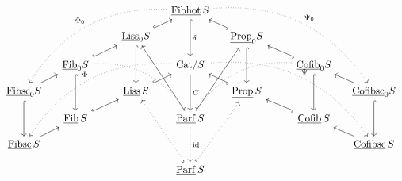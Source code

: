 \[
\begin{tikzcd}[column sep=small, row sep=small]
 & & & & \ul{Fibhot}\,S \arrow[dd,hook,"\delta"] \arrow[dddllll,dotted,bend right,"\Phi_0"'] \arrow[dddrrrr,dotted,bend left,"\Psi_0"] & & & & \\
 & & & \ul{Liss}_0S \arrow[ur,hook] \arrow[dd,hook] & & \ul{Prop}_0S \arrow[ul,hook] \arrow[dd,hook] & & & \\
 & \ul{Fib}_0S \arrow[urr,hook] \arrow[dd,hook] \arrow[ddrrr,dotted,bend left] & & & \Cat/S \arrow[dd,"C"] \arrow[dddllll,dotted,bend right,"\Phi"'] \arrow[dddrrrr,dotted,bend left,"\Psi"] & & & \ul{Cofib}_0S \arrow[ull,hook] \arrow[dd,hook] \arrow[ddlll,dotted,bend right] & \\ %
\ul{Fibsc}_0S \arrow[ur] \arrow[dd,hook] & & & \ul{Liss}\,S \arrow[ur,hook] & & \ul{Prop}\,S \arrow[ul,hook] & & & \ul{Cofibsc}_0S \arrow[ul] \arrow[dd,hook] \\
 & \ul{Fib}\,S \arrow[urr,hook] & & & \ul{Parf}\,S \arrow[uuul] \arrow[uuur] \arrow[dd,dotted,"\mathrm{id}"] & & & \ul{Cofib}\,S \arrow[ull,hook] & \\
\ul{Fibsc}\,S \arrow[ur] & & & & & & & & \ul{Cofibsc}\,S \arrow[ul] \\
 & & & & \ul{Parf}\,S \arrow[uuul,dotted,hook] \arrow[uuur,dotted,hook] & & & &
\end{tikzcd}
\]

